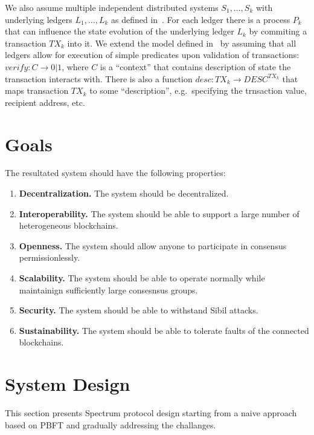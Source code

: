 \documentclass{article}
\begin{document}
    We also assume multiple independent distributed systems $S_1, \dots, S_k$ with underlying ledgers $L_1, \dots, L_k$ as defined in~\cite{cryptoeprint:2019/1128}.
    For each ledger there is a process $P_k$ that can influence the state evolution of the underlying ledger $L_k$ by commiting a transaction $TX_k$ into it.
    We extend the model defined in~\cite{cryptoeprint:2019/1128} by assuming that all ledgers allow for execution of simple predicates upon validation of transactions:
    $verify: C \rightarrow 0 | 1$, where $C$ is a \enquote{context} that contains description of state the transaction interacts with.
    There is also a function $desc: TX_k \rightarrow DESC^{TX_k}$ that maps transaction $TX_k$ to some \enquote{description}, e.g.\ specifying the trnsaction value, recipient address, etc.


    \section{Goals}\label{sec:goals}

    The resultated system should have the following properties:
    \begin{enumerate}
        \item \textbf{Decentralization.} The system should be decentralized.
        \item \textbf{Interoperability.} The system should be able to support a large number of heterogeneous blockchains.
        \item \textbf{Openness.} The system should allow anyone to participate in consensus permissionlessly.
        \item \textbf{Scalability.} The system should be able to operate normally while maintainign sufficiently large consesnsus groups.
        \item \textbf{Security.} The system should be able to withstand Sibil attacks.
        \item \textbf{Sustainability.} The system should be able to tolerate faults of the connected blockchains.
    \end{enumerate}


    \section{System Design}\label{sec:system-design}

    This section presents Spectrum protocol design starting from a naive approach based on PBFT and gradually addressing the challanges.
\end{document}

